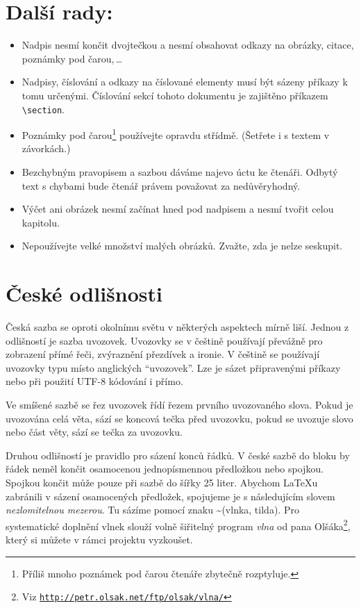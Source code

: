 \documentclass[twocolumn, a4paper, 10pt]{article}
\begin{document}
\section{Další rady:}
\label{third}
\begin{itemize}
    \item Nadpis nesmí končit dvojtečkou a nesmí obsahovat odkazy na obrázky, citace, poznámky pod čarou,\,\ldots
    \item Nadpisy, číslování a odkazy na číslované elementy musí být sázeny příkazy k tomu určenými. Číslování sekcí tohoto dokumentu je zajištěno příkazem \texttt{\textbackslash section}.
    \item Poznámky pod čarou\footnote{Příliš mnoho poznámek pod čarou čtenáře zbytečně rozptyluje.} používejte opravdu střídmě. (Šetřete i s textem v závorkách.)
    \item Bezchybným pravopisem a sazbou dáváme najevo úctu ke čtenáři. Odbytý text s chybami bude čtenář právem považovat za nedůvěryhodný.
    \item Výčet ani obrázek nesmí začínat hned pod nadpisem a nesmí tvořit celou kapitolu.
    \item Nepoužívejte velké množství malých obrázků. Zvažte, zda je nelze seskupit.
\end{itemize}

\section{České odlišnosti}
Česká sazba se oproti okolnímu světu v některých aspektech mírně liší. Jednou z odlišností je sazba uvozovek. Uvozovky se v češtině používají převážně pro zobrazení přímé řeči, zvýraznění přezdívek a ironie. V češtině se používají uvozovky typu  místo anglických ``uvozovek''. Lze je sázet připravenými příkazy nebo při použití UTF-8 kódování i přímo.

Ve smíšené sazbě se řez uvozovek řídí řezem prvního uvozovaného slova. Pokud je uvozována celá věta, sází se koncová tečka před uvozovku, pokud se uvozuje slovo nebo část věty, sází se tečka za uvozovku.

Druhou odlišností je pravidlo pro sázení konců řádků. V české sazbě do bloku by řádek neměl končit osamocenou jednopísmennou předložkou nebo spojkou. Spojkou  končit může pouze při sazbě do šířky 25 liter. Abychom \LaTeX u zabránili v sázení osamocených předložek, spojujeme je s následujícím slovem \emph{nezlomitelnou mezerou}. Tu sázíme pomocí znaku \textasciitilde (vlnka, tilda). Pro systematické doplnění vlnek slouží volně šiřitelný program \emph{vlna} od pana Olšáka\footnote{Viz \texttt{\href{http://petr.olsak.net/ftp/olsak/vlna/}{http://petr.olsak.net/ftp/olsak/vlna/}}}, který si můžete v rámci projektu vyzkoušet.
\end{document}
